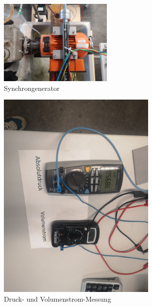 \begin{figure}[!ht]
    \centering
    \includegraphics[width=0.5\textwidth]{Abbildungen/Generator.jpeg}
    \caption{Synchrongenerator}
    \label{fig:Synchrongenerator}
\end{figure}
\begin{figure}[H]
	\centering
	\begin{minipage}{0.49\textwidth}
		\centering
		\includegraphics[width=0.7\textwidth,angle=90]{Abbildungen/Druck- & Volumenstrom-Messung.jpeg}
		\caption{Druck- und Volumenstrom-Messung}	
		\label{fig:D-V-Messung}
	\end{minipage}
	\hfill
\begin{minipage}{0.49\textwidth}
	\centering

\end{minipage}
\end{figure}
